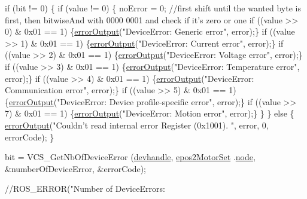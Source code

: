 \begin{DoxyCode}
{    \textcolor{keywordflow}{if} (bit != 0) \{
        \textcolor{keywordflow}{if} (value != 0) \{
            noError = 0;
            \textcolor{comment}{//first shift until the wanted byte is first, then bitwiseAnd with
       0000 0001 and check if it's zero or one}
            \textcolor{keywordflow}{if} ((value >> 0) & 0x01 == 1) \{\hyperlink{classEpos2MotorController_a64d5e3e3858597c111e60ba8b382a63b}{errorOutput}(\textcolor{stringliteral}{"DeviceError:
       Generic error"}, error);\}
            \textcolor{keywordflow}{if} ((value >> 1) & 0x01 == 1) \{\hyperlink{classEpos2MotorController_a64d5e3e3858597c111e60ba8b382a63b}{errorOutput}(\textcolor{stringliteral}{"DeviceError:
       Current error"}, error);\}
            \textcolor{keywordflow}{if} ((value >> 2) & 0x01 == 1) \{\hyperlink{classEpos2MotorController_a64d5e3e3858597c111e60ba8b382a63b}{errorOutput}(\textcolor{stringliteral}{"DeviceError:
       Voltage error"}, error);\}
            \textcolor{keywordflow}{if} ((value >> 3) & 0x01 == 1) \{\hyperlink{classEpos2MotorController_a64d5e3e3858597c111e60ba8b382a63b}{errorOutput}(\textcolor{stringliteral}{"DeviceError:
       Temperature error"}, error);\}
            \textcolor{keywordflow}{if} ((value >> 4) & 0x01 == 1) \{\hyperlink{classEpos2MotorController_a64d5e3e3858597c111e60ba8b382a63b}{errorOutput}(\textcolor{stringliteral}{"DeviceError:
       Communication error"}, error);\}
            \textcolor{keywordflow}{if} ((value >> 5) & 0x01 == 1) \{\hyperlink{classEpos2MotorController_a64d5e3e3858597c111e60ba8b382a63b}{errorOutput}(\textcolor{stringliteral}{"DeviceError:
       Device profile-specific error"}, error);\}
            \textcolor{keywordflow}{if} ((value >> 7) & 0x01 == 1) \{\hyperlink{classEpos2MotorController_a64d5e3e3858597c111e60ba8b382a63b}{errorOutput}(\textcolor{stringliteral}{"DeviceError:
       Motion error"}, error);\}
        \}
    \} \textcolor{keywordflow}{else} \{
        \hyperlink{classEpos2MotorController_a64d5e3e3858597c111e60ba8b382a63b}{errorOutput}(\textcolor{stringliteral}{"Couldn't read internal error Register (0x1001).
      "}, error, 0, errorCode);
    \}

    bit = VCS\_GetNbOfDeviceError (\hyperlink{classEpos2MotorController_a40594faab444bcba221ab9d55d1162cd}{devhandle}, \hyperlink{classEpos2MotorController_a0856f5fdd71ffa3b84a536afa085bfb1}{epos2MotorSet}
      .\hyperlink{structEpos2MotorController_1_1epos2Settings_ab8f18d3df17e8de9ed5250a3e53292c6}{node}, &numberOfDeviceError, &errorCode);

    \textcolor{comment}{//ROS\_ERROR("Number of DeviceErrors: %

}}
\end{DoxyCode}
